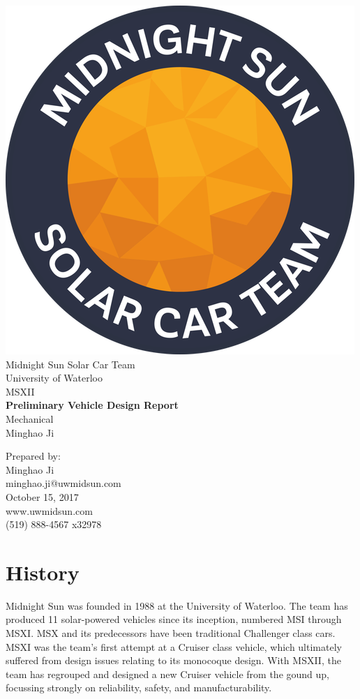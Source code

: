 \documentclass[10pt]{article}
\makeatletter
\newcommand\theteamname{Midnight Sun Solar Car Team} %
\newcommand\theuniversityname{University of Waterloo} %
\newcommand\theteamwebsite{www.uwmidsun.com} %
\newcommand\theteamphone{(519) 888-4567 x32978} %
\newcommand\thetitle{Preliminary Vehicle Design Report} %
\newcommand\thesubtitle{Mechanical} %
\newcommand\theauthor{Minghao Ji} %
\newcommand\theauthorcontact{minghao.ji@uwmidsun.com} %
\newcommand\thedate{October 15, 2017} %
\makeatother
\begin{document}


\begin{titlepage}
\large
\vspace*{2cm}
\centering
\includegraphics[width=.25\textwidth]{figures/midnightSunLogoCircle.png} \\
\vspace{1.5cm}
{\LARGE \theteamname} \\
\theuniversityname \\
\vspace{2.2cm}
{\LARGE MSXII} \\
\vspace{0.4cm}
{\huge\bfseries \thetitle} \\
\vspace{0.2cm}
{\LARGE \thesubtitle} \\
\vspace{2.2cm}
\ifdefined \theauthor
\par Prepared by: \\
\theauthor \\
\theauthorcontact \\
\fi
\thedate \\
\vfill
\theteamwebsite \\
\theteamphone
\end{titlepage}

\tableofcontents
\listoffigures %
\listoftables %

\section{History}
Midnight Sun was founded in 1988 at the University of Waterloo. The team has produced 11 solar-powered vehicles since its inception, numbered MSI through MSXI. MSX and its predecessors have been traditional Challenger class cars. MSXI was the team's first attempt at a Cruiser class vehicle, which ultimately suffered from design issues relating to its monocoque design. With MSXII, the team has regrouped and designed a new Cruiser vehicle from the gound up, focussing strongly on reliability, safety, and manufacturability.
\end{document}
